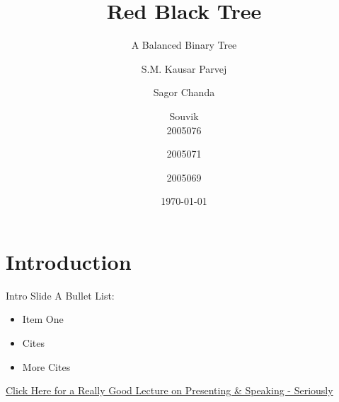 \documentclass[
    10pt, %
    aspectratio=169, %
]{beamer}
\title[RB Tree]{Red Black Tree}
\subtitle{A Balanced Binary Tree}
\author[Kausar \and Sagor \and Souvik]{S.M. Kausar Parvej \and Sagor Chanda \and Souvik \\ 2005076    \and   2005071 \and  2005069 }
\date{\today}
\institute[BUET]{Bangladesh University of Engineering and Technology }
\begin{document}
\section{}
\begin{frame}
	\titlepage %
\end{frame}






\section{Introduction}

\begin{frame}{Intro Slide}
    A Bullet List:
    \begin{itemize}
        \item Item One
        \item Cites \cite{Folch_Arribas-Bel_Koschinsky_Spielman_2016}
        \item More Cites \cite{singh_area_2003, spielman2020evaluating}
    \end{itemize}

\vspace{5em}

\href{https://www.youtube.com/watch?v=Unzc731iCUY}{Click Here for a Really Good Lecture on Presenting \& Speaking - Seriously}

\end{frame}
\end{document}
